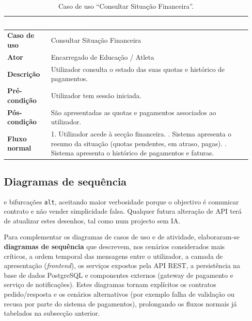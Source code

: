 \documentclass[a4paper,12pt]{scrreprt}
\begin{document}
{
\begin{table}[H]
\centering
\begin{tabularx}{\textwidth}{|l|X|}
\hline
\rowcolor{headerblue}\textcolor{white}{\textbf{Campo}} & \textcolor{white}{\textbf{Descrição}} \\ \hline
\textbf{Caso de uso} & Consultar Situação Financeira \\ \hline
\textbf{Ator} & Encarregado de Educação / Atleta \\ \hline
\textbf{Descrição} & Utilizador consulta o estado das suas quotas e histórico de pagamentos. \\ \hline
\textbf{Pré-condição} & Utilizador tem sessão iniciada. \\ \hline
\textbf{Pós-condição} & São apresentadas as quotas e pagamentos associados ao utilizador. \\ \hline
\textbf{Fluxo normal} &
1. Utilizador acede à secção financeira. \newline
2. Sistema apresenta o resumo da situação (quotas pendentes, em atraso, pagas). \newline
3. Sistema apresenta o histórico de pagamentos e faturas. \\ \hline
\end{tabularx}
\caption{Caso de uso ``Consultar Situação Financeira''.}
\label{tab:uc_consultar_financeira}
\end{table}

\subsection{Diagramas de sequência}

 e bifurcações \texttt{alt}, aceitando maior verbosidade porque o objectivo é comunicar contrato e não vender simplicidade falsa. Qualquer futura alteração de API terá de atualizar estes desenhos, tal como num projecto sem IA.

Para complementar os diagramas de casos de uso e de atividade, elaboraram-se \textbf{diagramas de sequência} que descrevem, nos cenários considerados mais críticos, a ordem temporal das mensagens entre o utilizador, a camada de apresentação (\textit{frontend}), os serviços expostos pela API REST, a persistência na base de dados PostgreSQL e componentes externos (gateway de pagamento e serviço de notificações). Estes diagramas tornam explícitos os contratos pedido/resposta e os cenários alternativos (por exemplo falha de validação ou recusa por parte do sistema de pagamentos), prolongando os fluxos normais já tabelados na subsecção anterior.

}
\end{document}
